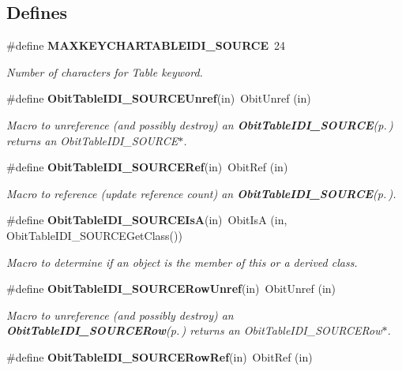 \subsection*{Defines}
\begin{CompactItemize}
\item 
\#define {\bf MAXKEYCHARTABLEIDI\_\-SOURCE}\ 24
\begin{CompactList}\small\item\em Number of characters for Table keyword. \item\end{CompactList}\item 
\#define {\bf Obit\-Table\-IDI\_\-SOURCEUnref}(in)\ Obit\-Unref (in)
\begin{CompactList}\small\item\em Macro to unreference (and possibly destroy) an {\bf Obit\-Table\-IDI\_\-SOURCE}{\rm (p.\,\pageref{structObitTableIDI__SOURCE})} returns an Obit\-Table\-IDI\_\-SOURCE$\ast$. \item\end{CompactList}\item 
\#define {\bf Obit\-Table\-IDI\_\-SOURCERef}(in)\ Obit\-Ref (in)
\begin{CompactList}\small\item\em Macro to reference (update reference count) an {\bf Obit\-Table\-IDI\_\-SOURCE}{\rm (p.\,\pageref{structObitTableIDI__SOURCE})}. \item\end{CompactList}\item 
\#define {\bf Obit\-Table\-IDI\_\-SOURCEIs\-A}(in)\ Obit\-Is\-A (in, Obit\-Table\-IDI\_\-SOURCEGet\-Class())
\begin{CompactList}\small\item\em Macro to determine if an object is the member of this or a derived class. \item\end{CompactList}\item 
\#define {\bf Obit\-Table\-IDI\_\-SOURCERow\-Unref}(in)\ Obit\-Unref (in)
\begin{CompactList}\small\item\em Macro to unreference (and possibly destroy) an {\bf Obit\-Table\-IDI\_\-SOURCERow}{\rm (p.\,\pageref{structObitTableIDI__SOURCERow})} returns an Obit\-Table\-IDI\_\-SOURCERow$\ast$. \item\end{CompactList}\item 
\#define {\bf Obit\-Table\-IDI\_\-SOURCERow\-Ref}(in)\ Obit\-Ref (in)

\end{CompactItemize}
